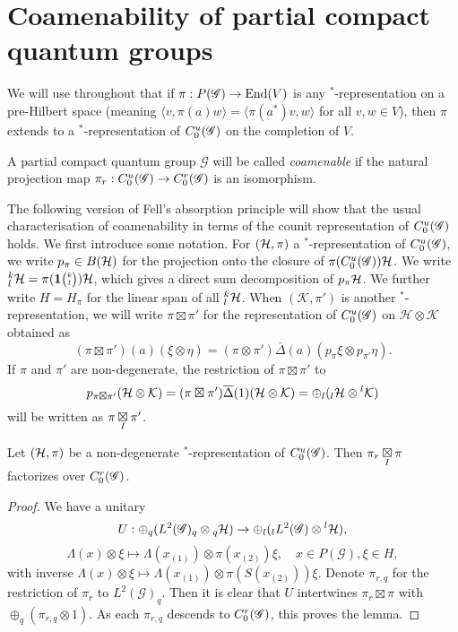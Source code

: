 \section{Coamenability of partial compact quantum groups}

We will use throughout that if $\pi: P(\mathscr{G}) \rightarrow \operatorname{\mathrm{End}}(V)$ is any $^*$-representation on a pre-Hilbert space (meaning $\langle v,\pi(a)w\rangle = \langle \pi(a^*)v,w\rangle$ for all $v,w\in V$), then $\pi$ extends to a $^*$-representation of $C^{u}_{0}(\mathscr{G})$ on the completion of $V$.

\begin{Def} A partial compact quantum group $\mathscr{G}$ will be called \emph{coamenable} if the natural projection map $\pi_r:C^{u}_{0}(\mathscr{G})\rightarrow C^{r}_{0}(\mathscr{G})$ is an isomorphism.
\end{Def}


The following version of Fell's absorption principle will show that the usual characterisation of coamenability in terms of the counit representation of $C^{u}_{0}(\mathscr{G})$ holds. We first introduce some notation. %
For $(\mathcal{H},\pi)$ a $^*$-representation of $C^{u}_{0}(\mathscr{G})$, we write $p_{\pi}\in B(\mathcal{H})$ for the projection onto the closure of $\pi(C^{u}_{0}(\mathscr{G}))\mathcal{H}$. We write ${}^{k}_{l}\mathcal{H} = \pi(\mathbf{1}{\tiny {\begin{pmatrix} k\\l\end{pmatrix}}})\mathcal{H}$, which gives a direct sum decomposition of $p_{\pi}\mathcal{H}$. We further write $H=H_{\pi}$ for the linear span of all ${}^{k}_{l}\mathcal{H}$. When $(\mathcal{K},\pi')$ is another $^*$-representation, we will write $\pi \boxtimes \pi'$ for the representation of $C^{u}_{0}(\mathscr{G})$ on $\mathcal{H}\otimes \mathcal{K}$ obtained as \[(\pi \boxtimes \pi')(a)(\xi\otimes \eta) = (\pi\otimes \pi')\bar{\Delta}(a)(p_{\pi}\xi\otimes p_{\pi'}\eta).\] If $\pi$ and $\pi'$ are non-degenerate, the restriction of $\pi\boxtimes \pi'$ to \[p_{\pi \boxtimes \pi'}(\mathcal{H}\otimes \mathcal{K}) = (\pi \boxtimes \pi')\overline{\Delta}(1)(\mathcal{H}\otimes \mathcal{K})= \oplus_l ({}_l\mathcal{H}\otimes {}^l\mathcal{K})\] will be written as $\pi\underset{I}{\boxtimes} \pi'$. 

\begin{Lem} Let $(\mathcal{H},\pi)$ be a non-degenerate $^*$-representation of $C^{u}_{0}(\mathscr{G})$. Then $\pi_r\underset{I}{\boxtimes} \pi$ factorizes over $C^{r}_{0}(\mathscr{G})$.
\end{Lem}

\begin{proof}  We have a unitary \[U: \oplus_q (L^2(\mathscr{G})_q\otimes {}_q\mathcal{H} ) \rightarrow \oplus_l ({}_l L^2(\mathscr{G})\otimes {}^l\mathcal{H}),\]\[\Lambda(x)\otimes \xi \mapsto \Lambda(x_{(1)})\otimes \pi(x_{(2)})\xi,\quad x\in P(\mathscr{G}),\xi\in H,\] with inverse $\Lambda(x)\otimes \xi \mapsto \Lambda(x_{(1)})\otimes \pi(S(x_{(2)}))\xi$. Denote $\pi_{r,q}$ for the restriction of $\pi_r$ to $L^2(\mathscr{G})_q$. Then it is clear that $U$ intertwines $\pi_r\boxtimes \pi$ with $\oplus_q (\pi_{r,q}\otimes 1)$. As each $\pi_{r,q}$ descends to $C^{r}_{0}(\mathscr{G})$, this proves the lemma.
\end{proof} 

